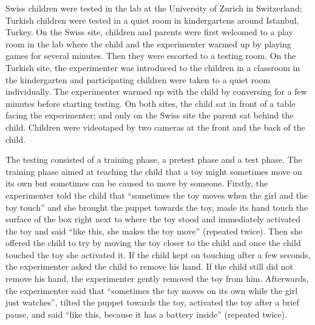 \documentclass[man]{apa6}
\begin{document}
Swiss children were tested in the lab at the University of Zurich in
Switzerland; Turkish children were tested in a quiet room in
kindergartens around Istanbul, Turkey. On the Swiss site, children and
parents were first welcomed to a play room in the lab where the child
and the experimenter warmed up by playing games for several minutes.
Then they were escorted to a testing room. On the Turkish site, the
experimenter was introduced to the children in a classroom in the
kindergarten and participating children were taken to a quiet room
individually. The experimenter warmed up with the child by conversing
for a few minutes before starting testing. On both sites, the child sat
in front of a table facing the experimenter; and only on the Swiss site
the parent sat behind the child. Children were videotaped by two cameras
at the front and the back of the child.

The testing consisted of a training phase, a pretest phase and a test
phase. The training phase aimed at teaching the child that a toy might
sometimes move on its own but sometimes can be caused to move by
someone. Firstly, the experimenter told the child that
\enquote{sometimes the toy moves when the girl and the toy touch} and
she brought the puppet towards the toy, made its hand touch the surface
of the box right next to where the toy stood and immediately activated
the toy and said \enquote{like this, she makes the toy move} (repeated
twice). Then she offered the child to try by moving the toy closer to
the child and once the child touched the toy she activated it. If the
child kept on touching after a few seconds, the experimenter asked the
child to remove his hand. If the child still did not remove his hand,
the experimenter gently removed the toy from him. Afterwards, the
experimenter said that \enquote{sometimes the toy moves on its own while
the girl just watches}, tilted the puppet towards the toy, activated the
toy after a brief pause, and said \enquote{like this, because it has a
battery inside} (repeated twice).
\end{document}
